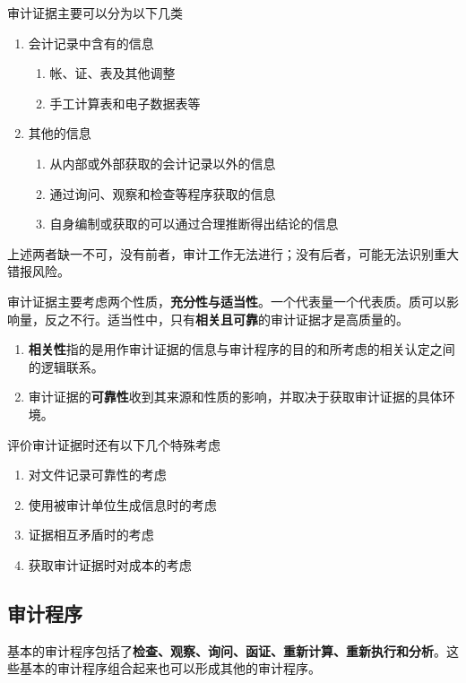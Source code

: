\documentclass[UTF8,12pt]{ctexart}
\numberwithin{equation}{section} %
\numberwithin{figure}{section}
\numberwithin{table}{section}
\begin{document}
	审计证据主要可以分为以下几类
	\begin{enumerate}
		\item 会计记录中含有的信息
		\begin{enumerate}
			\item 帐、证、表及其他调整
			
			\item 手工计算表和电子数据表等
		\end{enumerate}
		
		\item 其他的信息
		\begin{enumerate}
			\item 从内部或外部获取的会计记录以外的信息
			
			\item 通过询问、观察和检查等程序获取的信息
			
			\item 自身编制或获取的可以通过合理推断得出结论的信息
		\end{enumerate}
	\end{enumerate}
	
	上述两者缺一不可，没有前者，审计工作无法进行；没有后者，可能无法识别重大错报风险。
	
	审计证据主要考虑两个性质，\textbf{充分性与适当性}。一个代表量一个代表质。质可以影响量，反之不行。适当性中，只有\textbf{相关且可靠}的审计证据才是高质量的。
	\begin{enumerate}
		\item \textbf{相关性}指的是用作审计证据的信息与审计程序的目的和所考虑的相关认定之间的逻辑联系。
		
		\item 审计证据的\textbf{可靠性}收到其来源和性质的影响，并取决于获取审计证据的具体环境。
	\end{enumerate}
	
	评价审计证据时还有以下几个特殊考虑
	\begin{enumerate}
		\item 对文件记录可靠性的考虑
		
		\item 使用被审计单位生成信息时的考虑
		
		\item 证据相互矛盾时的考虑
		
		\item 获取审计证据时对成本的考虑
	\end{enumerate}
	
	\subsection{审计程序}
	基本的审计程序包括了\textbf{检查、观察、询问、函证、重新计算、重新执行和分析}。这些基本的审计程序组合起来也可以形成其他的审计程序。
	
\end{document}
